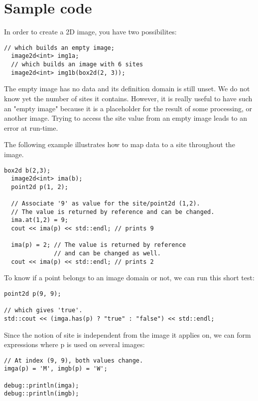 \documentclass{report}
\begin{document}
\section{Sample code}
In order to create a 2D image, you have two possibilites:
\begin{lstlisting}[frame=single]
  // which builds an empty image;
  image2d<int> img1a;
  // which builds an image with 6 sites
  image2d<int> img1b(box2d(2, 3));
\end{lstlisting}

The empty image has no data and its definition domain is still unset.  We do
not know yet the number of sites it contains. However, it is really useful to
have such an "empty image" because it is a placeholder for the result of some
processing, or another image. Trying to access the site value from an empty
image leads to an error at run-time.

The following example illustrates how to map data to a site throughout the
image.

\begin{lstlisting}[frame=single]
  box2d b(2,3);
  image2d<int> ima(b);
  point2d p(1, 2);

  // Associate '9' as value for the site/point2d (1,2).
  // The value is returned by reference and can be changed.
  ima.at(1,2) = 9;
  cout << ima(p) << std::endl; // prints 9

  ima(p) = 2; // The value is returned by reference
              // and can be changed as well.
  cout << ima(p) << std::endl; // prints 2
\end{lstlisting}


To know if a point belongs to an image domain or not, we can run this short
test:
\begin{lstlisting}[frame=single]
point2d p(9, 9);

// which gives 'true'.
std::cout << (imga.has(p) ? "true" : "false") << std::endl;
\end{lstlisting}

Since the notion of site is independent from the image it applies on, we can
form expressions where p is used on several images:
\begin{lstlisting}[frame=single]
// At index (9, 9), both values change.
imga(p) = 'M', imgb(p) = 'W';

debug::println(imga);
debug::println(imgb);
\end{lstlisting}
\end{document}
